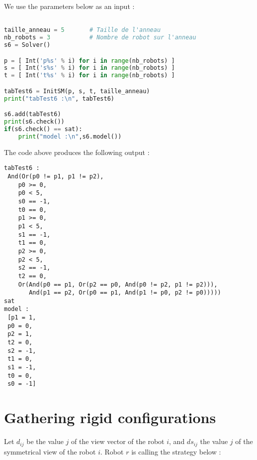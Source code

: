 \documentclass{article}
\begin{document}
We use the parameters below as an input :
\begin{lstlisting}[language=Python]

taille_anneau = 5       # Taille de l'anneau 
nb_robots = 3           # Nombre de robot sur l'anneau
s6 = Solver()

p = [ Int('p%s' % i) for i in range(nb_robots) ]
s = [ Int('s%s' % i) for i in range(nb_robots) ]
t = [ Int('t%s' % i) for i in range(nb_robots) ]

tabTest6 = InitSM(p, s, t, taille_anneau)
print("tabTest6 :\n", tabTest6)

s6.add(tabTest6)
print(s6.check())
if(s6.check() == sat):
    print("model :\n",s6.model())
\end{lstlisting}
The code above produces the following output : 
\begin{lstlisting}
tabTest6 :
 And(Or(p0 != p1, p1 != p2),
    p0 >= 0,
    p0 < 5,
    s0 == -1,
    t0 == 0,
    p1 >= 0,
    p1 < 5,
    s1 == -1,
    t1 == 0,
    p2 >= 0,
    p2 < 5,
    s2 == -1,
    t2 == 0,
    Or(And(p0 == p1, Or(p2 == p0, And(p0 != p2, p1 != p2))),
       And(p1 == p2, Or(p0 == p1, And(p1 != p0, p2 != p0)))))
sat
model :
 [p1 = 1,
 p0 = 0,
 p2 = 1,
 t2 = 0,
 s2 = -1,
 t1 = 0,
 s1 = -1,
 t0 = 0,
 s0 = -1]
\end{lstlisting}

\section{Gathering rigid configurations}


Let $d_{ij}$ be the value $j$ of the view vector of the robot $i$, and $ds_{ij}$ the value $j$ of the symmetrical view of the
robot $i$.
Robot $r$ is calling the strategy below :
\end{document}
